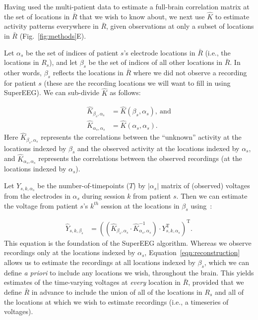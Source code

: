\documentclass[11pt]{article}
\begin{document}
Having used the multi-patient data to estimate a full-brain
correlation matrix at the set of locations in $\bar{R}$ that we wish
to know about, we next use $\hat{K}$ to estimate activity patterns
everywhere in $\bar{R}$, given observations at only a subset of
locations in $\bar{R}$ (Fig.~\ref{fig:methods}E).

Let $\alpha_s$ be the set of indices of patient $s$'s electrode locations in
$\bar{R}$ (i.e., the locations in $R_s$), and let $\beta_s$ be the set of indices of all other
locations in $\bar{R}$. In other words, $\beta_s$ reflects the locations
in $\bar{R}$ where we did not observe a recording for patient $s$
(these are the recording locations we will want to fill in using SuperEEG).
We can sub-divide $\hat{K}$ as follows:

\begin{align}
\hat{K}_{\beta_s,\alpha_s} &= \hat{K}(\beta_s,\alpha_s),~\mathrm{and}\label{eqn:Kba}\\
\hat{K}_{\alpha_s,\alpha_s} &= \hat{K}(\alpha_s,\alpha_s)\label{eqn:Kaa}.
\end{align}
Here $\hat{K}_{\beta_s, \alpha_s}$ represents the correlations between
the ``unknown'' activity at the locations indexed by $\beta_s$ and the
observed activity at the locations indexed by $\alpha_s$, and
$\hat{K}_{\alpha_s, \alpha_s}$ represents the correlations between the
observed recordings (at the locations indexed by $\alpha_s$).

Let $Y_{s,k,\alpha_s}$ be the number-of-timepoints ($T$) by
$\left|\alpha_s\right|$ matrix of (observed) voltages from the electrodes in
$\alpha_s$ during session $k$ from patient $s$. Then we can estimate the
voltage from patient $s$'s $k^{th}$ session at the locations in
$\beta_s$ using~\cite{Rasm06}:

\begin{align}
\hat{Y}_{s,k,\beta_s} &= ((\hat{K}_{\beta_s,\alpha_s}\cdot\hat{K}_{\alpha_s,\alpha_s}^{-1})\cdot Y_{s,k,\alpha_s}^\mathrm{T})^\mathrm{T}.\label{eqn:reconstruction}
\end{align}
This equation is the foundation of the SuperEEG algorithm.  Whereas we
observe recordings only at the locations indexed by $\alpha_s$,
Equation~\ref{eqn:reconstruction} allows us to estimate the recordings
at all locations indexed by $\beta_s$, which we can define \textit{a priori}
to include any locations we wish, throughout the brain.  This yields
estimates of the time-varying voltages at \textit{every} location in
$\bar{R}$, provided that we define $\bar{R}$ in advance to include the
union of all of the locations in $R_s$ and all of the locations
at which we wish to estimate recordings (i.e., a timeseries of
voltages).
\end{document}
